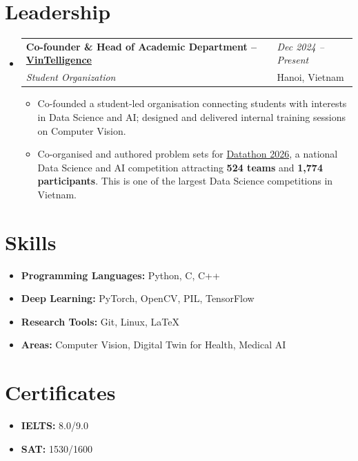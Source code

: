 \documentclass[a4paper,10pt]{article}
\makeatletter
\newcommand{\resumeHeading}[4]{%
  \begin{tabularx}{\textwidth}[t]{%
    @{}>{\raggedright\arraybackslash}X
    >{\raggedleft\arraybackslash}p{0.24\textwidth}@{}%
  }
    \textbf{#1} & \textit{#2} \\
    \textit{#3} & #4
  \end{tabularx}%
}
\makeatother
\begin{document}
\section{Leadership}
\begin{itemize}
  \item \resumeHeading
    {Co-founder \& Head of Academic Department -- \href{https://www.facebook.com/vintelligencevinuni/}{VinTelligence}}
    {Dec 2024 -- Present}
    {Student Organization}
    {Hanoi, Vietnam}
    \begin{itemize}
      \item Co-founded a student-led organisation connecting students with interests in Data Science and AI; designed and delivered internal training sessions on Computer Vision.
      \item Co-organised and authored problem sets for \href{https://www.datathon.site/}{Datathon 2026}, a national Data Science and AI competition attracting \textbf{524 teams} and \textbf{1,774 participants}. This is one of the largest Data Science competitions in Vietnam.
    \end{itemize}
\end{itemize}

\section{Skills}
\begin{itemize}
  \item \textbf{Programming Languages:} Python, C, C++
  \item \textbf{Deep Learning:} PyTorch, OpenCV, PIL, TensorFlow
  \item \textbf{Research Tools:} Git, Linux, LaTeX
  \item \textbf{Areas:} Computer Vision, Digital Twin for Health, Medical AI
\end{itemize}

\section{Certificates}
\begin{itemize}
  \item \textbf{IELTS:} 8.0/9.0 
  \item \textbf{SAT:} 1530/1600
\end{itemize}
\end{document}
